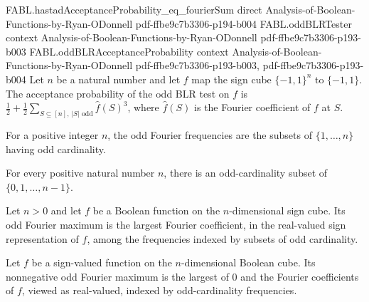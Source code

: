 \begin{theorem}
  {FABL.hastadAcceptanceProbability_eq_fourierSum}
  {direct}
  {Analysis-of-Boolean-Functions-by-Ryan-ODonnell}
  {pdf-ffbe9c7b3306-p194-b004}
\proofstep
  {FABL.oddBLRTester}
  {context}
  {Analysis-of-Boolean-Functions-by-Ryan-ODonnell}
  {pdf-ffbe9c7b3306-p193-b003}
\proofstep
  {FABL.oddBLRAcceptanceProbability}
  {context}
  {Analysis-of-Boolean-Functions-by-Ryan-ODonnell}
  {pdf-ffbe9c7b3306-p193-b003,
    pdf-ffbe9c7b3306-p193-b004}
Let $n$ be a natural number and let $f$ map the sign cube $\{-1,1\}^n$ to $\{ -1,1
\}$. The acceptance probability of the odd BLR test on $f$ is
$\frac12+\frac12\sum_{S\subseteq[n],\,|S|\text{ odd}}\widehat f(S)^3$, where
$\widehat f(S)$ is the Fourier coefficient of $f$ at $S$.
\end{theorem}

\begin{definition}
\label{FABL.oddFourierFrequencies}
\leanok
For a positive integer $n$, the odd Fourier frequencies are the subsets of
$\{1,\ldots,n\}$ having odd cardinality.
\end{definition}

\begin{theorem}
\label{FABL.oddFourierFrequencies_nonempty}
\leanok
{}
For every positive natural number $n$, there is an odd-cardinality subset of
$\{0,1,\ldots,n-1\}$.
\end{theorem}

\begin{definition}
\label{FABL.oddFourierMaximum}
\leanok
{}
Let $n>0$ and let $f$ be a Boolean function on the $n$-dimensional sign cube. Its odd
Fourier maximum is the largest Fourier coefficient, in the real-valued sign
representation of $f$, among the frequencies indexed by subsets of odd cardinality.
\end{definition}

\begin{definition}
\label{FABL.nonnegativeOddFourierMaximum}
\leanok
{}
Let $f$ be a sign-valued function on the $n$-dimensional Boolean cube. Its nonnegative
odd Fourier maximum is the largest of $0$ and the Fourier coefficients of $f$, viewed as
real-valued, indexed by odd-cardinality frequencies.
\end{definition}

